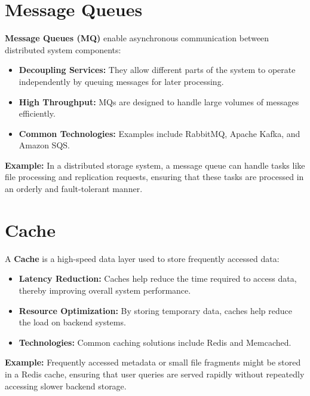 \section{Message Queues}
\textbf{Message Queues (MQ)} enable asynchronous communication between distributed system components:
\begin{itemize}
    \item \textbf{Decoupling Services:} They allow different parts of the system to operate independently by queuing messages for later processing.
    \item \textbf{High Throughput:} MQs are designed to handle large volumes of messages efficiently.
    \item \textbf{Common Technologies:} Examples include RabbitMQ, Apache Kafka, and Amazon SQS.
\end{itemize}
\textbf{Example:} In a distributed storage system, a message queue can handle tasks like file processing and replication requests, ensuring that these tasks are processed in an orderly and fault-tolerant manner.

\section{Cache}
A \textbf{Cache} is a high-speed data layer used to store frequently accessed data:
\begin{itemize}
    \item \textbf{Latency Reduction:} Caches help reduce the time required to access data, thereby improving overall system performance.
    \item \textbf{Resource Optimization:} By storing temporary data, caches help reduce the load on backend systems.
    \item \textbf{Technologies:} Common caching solutions include Redis and Memcached.
\end{itemize}
\textbf{Example:} Frequently accessed metadata or small file fragments might be stored in a Redis cache, ensuring that user queries are served rapidly without repeatedly accessing slower backend storage.

